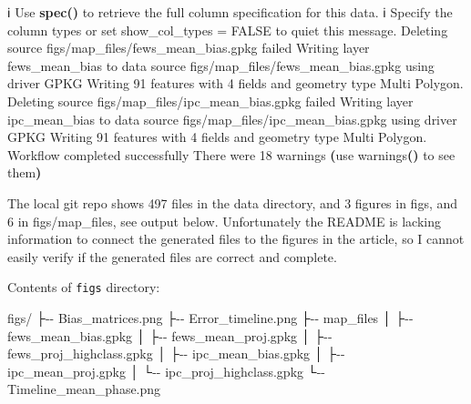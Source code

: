 \documentclass[
  a4paper,
]{article}
\newenvironment{Shaded}{\begin{snugshade}}{\end{snugshade}}
\newcommand{\ErrorTok}[1]{\textcolor[rgb]{0.64,0.00,0.00}{\textbf{#1}}}
\newcommand{\ExtensionTok}[1]{#1}
\newcommand{\FunctionTok}[1]{\textcolor[rgb]{0.13,0.29,0.53}{\textbf{#1}}}
\newcommand{\KeywordTok}[1]{\textcolor[rgb]{0.13,0.29,0.53}{\textbf{#1}}}
\newcommand{\NormalTok}[1]{#1}
\newcommand{\StringTok}[1]{\textcolor[rgb]{0.31,0.60,0.02}{#1}}
\begin{document}
\begin{Shaded}
\begin{Highlighting}[]
\ExtensionTok{ℹ}\NormalTok{ Use }\KeywordTok{\textasciigrave{}}\FunctionTok{spec()}\KeywordTok{\textasciigrave{}}\NormalTok{ to retrieve the full column specification for this data.}
\ExtensionTok{ℹ}\NormalTok{ Specify the column types or set }\KeywordTok{\textasciigrave{}}\ExtensionTok{show\_col\_types}\NormalTok{ = FALSE}\KeywordTok{\textasciigrave{}}\NormalTok{ to quiet this message.}
\ExtensionTok{Deleting}\NormalTok{ source }\KeywordTok{\textasciigrave{}}\ExtensionTok{figs/map\_files/fews\_mean\_bias.gpkg}\StringTok{\textquotesingle{} failed}
\StringTok{Writing layer \textasciigrave{}fews\_mean\_bias\textquotesingle{}}\NormalTok{ to data source }\KeywordTok{\textasciigrave{}}\NormalTok{figs/map\_files/fews\_mean\_bias.gpkg}\StringTok{\textquotesingle{} using driver \textasciigrave{}GPKG\textquotesingle{}}
\ExtensionTok{Writing}\NormalTok{ 91 features with 4 fields and geometry type Multi Polygon.}
\ExtensionTok{Deleting}\NormalTok{ source }\KeywordTok{\textasciigrave{}}\ExtensionTok{figs/map\_files/ipc\_mean\_bias.gpkg}\StringTok{\textquotesingle{} failed}
\StringTok{Writing layer \textasciigrave{}ipc\_mean\_bias\textquotesingle{}}\NormalTok{ to data source }\KeywordTok{\textasciigrave{}}\NormalTok{figs/map\_files/ipc\_mean\_bias.gpkg}\StringTok{\textquotesingle{} using driver \textasciigrave{}GPKG\textquotesingle{}}
\ExtensionTok{Writing}\NormalTok{ 91 features with 4 fields and geometry type Multi Polygon.}
\ExtensionTok{Workflow}\NormalTok{ completed successfully}
\ExtensionTok{There}\NormalTok{ were 18 warnings }\ErrorTok{(}\ExtensionTok{use}\NormalTok{ warnings}\ErrorTok{(}\KeywordTok{)} \ExtensionTok{to}\NormalTok{ see them}\KeywordTok{)}
\end{Highlighting}
\end{Shaded}

\normalsize

The local git repo shows 497 files in the data directory, and 3 figures
in figs, and 6 in figs/map\_files, see output below. Unfortunately the
README is lacking information to connect the generated files to the
figures in the article, so I cannot easily verify if the generated files
are correct and complete.

Contents of \texttt{figs} directory:

\scriptsize

\begin{Shaded}
\begin{Highlighting}[]
\NormalTok{figs/}
\NormalTok{├{-}{-} Bias\_matrices.png}
\NormalTok{├{-}{-} Error\_timeline.png}
\NormalTok{├{-}{-} map\_files}
\NormalTok{│   ├{-}{-} fews\_mean\_bias.gpkg}
\NormalTok{│   ├{-}{-} fews\_mean\_proj.gpkg}
\NormalTok{│   ├{-}{-} fews\_proj\_highclass.gpkg}
\NormalTok{│   ├{-}{-} ipc\_mean\_bias.gpkg}
\NormalTok{│   ├{-}{-} ipc\_mean\_proj.gpkg}
\NormalTok{│   └{-}{-} ipc\_proj\_highclass.gpkg}
\NormalTok{└{-}{-} Timeline\_mean\_phase.png}
\end{Highlighting}
\end{Shaded}
\end{document}
